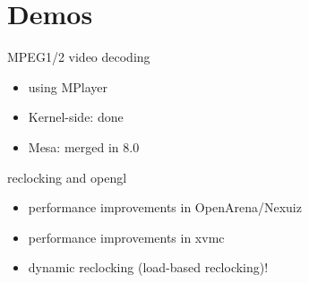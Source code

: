 \documentclass[11pt,english,compress]{beamer}
\begin{document}
\section{Demos}
	\begin{frame}
		\begin{block}{MPEG1/2 video decoding}
			\begin{itemize}
				\item using MPlayer
				\item Kernel-side: done
				\item Mesa: merged in 8.0
			\end{itemize}
		\end{block}

		\begin{block}{reclocking and opengl}
			\begin{itemize}
				\item performance improvements in OpenArena/Nexuiz
				\item performance improvements in xvmc
				\item dynamic reclocking (load-based reclocking)!
			\end{itemize}
		\end{block}
	\end{frame}
\end{document}
